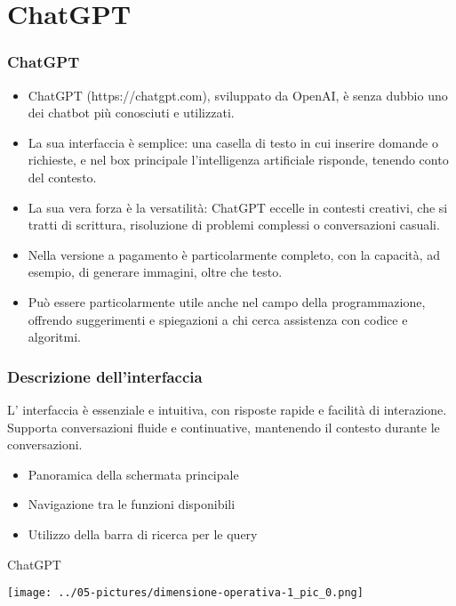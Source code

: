 \documentclass[aspectratio=169]{beamer}
\begin{document}
\section{ChatGPT}
%
%
\begin{frame}
\frametitle{ChatGPT}
\begin{itemize}
    \item ChatGPT (https://chatgpt.com), sviluppato da OpenAI, è senza dubbio uno dei chatbot più conosciuti e utilizzati.
    \item La sua interfaccia è semplice: una casella di testo in cui inserire domande o richieste, e nel box principale l’intelligenza artificiale risponde, tenendo conto del contesto.
    \item La sua vera forza è la versatilità: ChatGPT eccelle in contesti creativi, che si tratti di scrittura, risoluzione di problemi complessi o conversazioni casuali.
    \item Nella versione a pagamento è particolarmente completo, con la capacità, ad esempio, di generare immagini, oltre che testo.
    \item Può essere particolarmente utile anche nel campo della programmazione, offrendo suggerimenti e spiegazioni a chi cerca assistenza con codice e algoritmi.
\end{itemize}
\end{frame}
%
%
\begin{frame}
\frametitle{Descrizione dell'interfaccia}
L’ interfaccia è essenziale e intuitiva, con risposte rapide e facilità di interazione. Supporta conversazioni fluide e continuative, mantenendo il contesto durante le conversazioni.\\
\vspace{0.5cm}
\begin{itemize}
    \item Panoramica della schermata principale
    \item Navigazione tra le funzioni disponibili
    \item Utilizzo della barra di ricerca per le query
\end{itemize}
\end{frame}
%
%
\begin{frame}{ChatGPT}
\begin{center}
\texttt{[image: ../05-pictures/dimensione-operativa-1\_pic\_0.png]} 
\end{center}
\end{frame}
\end{document}
